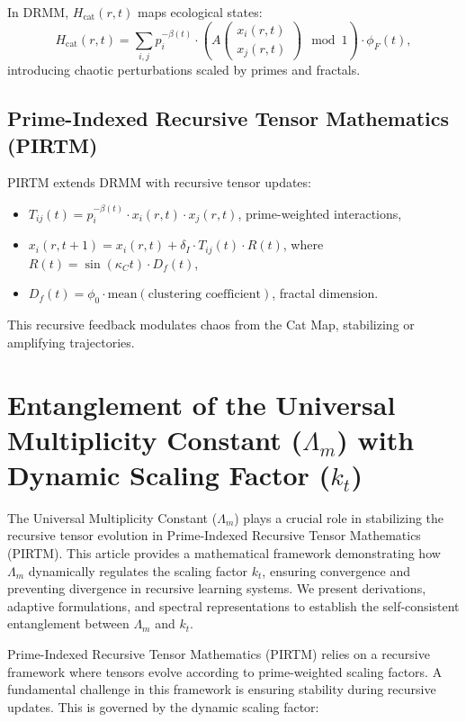 \documentclass{article}
\theoremstyle{plain}
\begin{document}
In DRMM, \( H_{\text{cat}}(r,t) \) maps ecological states:
\begin{equation}
H_{\text{cat}}(r,t) = \sum_{i,j} p_i^{-\beta(t)} \cdot \left( A \begin{pmatrix} x_i(r,t) \\ x_j(r,t) \end{pmatrix} \mod 1 \right) \cdot \phi_F(t),
\end{equation}
introducing chaotic perturbations scaled by primes and fractals.

\subsection{Prime-Indexed Recursive Tensor Mathematics (PIRTM)}
PIRTM extends DRMM with recursive tensor updates:
\begin{itemize}
    \item \( T_{ij}(t) = p_i^{-\beta(t)} \cdot x_i(r,t) \cdot x_j(r,t) \), prime-weighted interactions,
    \item \( x_i(r,t+1) = x_i(r,t) + \delta_I \cdot T_{ij}(t) \cdot R(t) \), where \( R(t) = \sin(\kappa_C t) \cdot D_f(t) \),
    \item \( D_f(t) = \phi_0 \cdot \text{mean}(\text{clustering coefficient}) \), fractal dimension.
\end{itemize}
This recursive feedback modulates chaos from the Cat Map, stabilizing or amplifying trajectories.
\section{Entanglement of the Universal Multiplicity Constant ($\Lambda_m$) with Dynamic Scaling Factor ($k_t$)}

The Universal Multiplicity Constant ($\Lambda_m$) plays a crucial role in stabilizing the recursive tensor evolution in Prime-Indexed Recursive Tensor Mathematics (PIRTM). This article provides a mathematical framework demonstrating how $\Lambda_m$ dynamically regulates the scaling factor $k_t$, ensuring convergence and preventing divergence in recursive learning systems. We present derivations, adaptive formulations, and spectral representations to establish the self-consistent entanglement between $\Lambda_m$ and $k_t$.

Prime-Indexed Recursive Tensor Mathematics (PIRTM) relies on a recursive framework where tensors evolve according to prime-weighted scaling factors. A fundamental challenge in this framework is ensuring stability during recursive updates. This is governed by the dynamic scaling factor:
\end{document}
